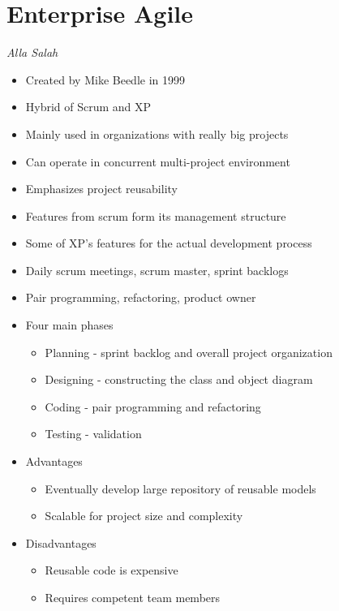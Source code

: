 \documentclass{report}
\begin{document}
		\section{Enterprise Agile}
			\textit{Alla Salah}
			\begin{itemize}
				\item Created by Mike Beedle in 1999
				\item Hybrid of Scrum and XP
				\item Mainly used in organizations with really big projects
				\item Can operate in concurrent multi-project environment
				\item Emphasizes project reusability
				\item Features from scrum form its management structure
				\item Some of XP's features for the actual development process
				\item Daily scrum meetings, scrum master, sprint backlogs
				\item Pair programming, refactoring, product owner
				\item Four main phases
					\begin{itemize}
						\item Planning - sprint backlog and overall project organization
						\item Designing - constructing the class and object diagram
						\item Coding - pair programming and refactoring
						\item Testing - validation
					\end{itemize}
				\item Advantages
					\begin{itemize}
						\item Eventually develop large repository of reusable models
						\item Scalable for project size and complexity
					\end{itemize}
				\item Disadvantages
					\begin{itemize}
						\item Reusable code is expensive
						\item Requires competent team members
					\end{itemize}
			\end{itemize}
\end{document}
